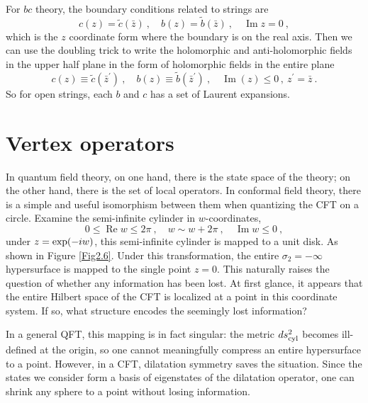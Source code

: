 For $bc$ theory, the boundary conditions related to strings are    
\begin{equation}
	c(z)=\tilde{c}(\bar{z})\: , \quad b(z)=\tilde{b}(\bar{z}) \:, \quad \operatorname{Im} z=0 \:,  \label{2.7.29}
\end{equation}
which is the $z$ coordinate form where the boundary is on the real axis.    
Then we can use the doubling trick to write the holomorphic and anti-holomorphic fields in the upper half plane in the form of holomorphic fields in the entire plane    
\begin{equation}
	c(z) \equiv \tilde{c}(\bar{z}^{\prime})\:, \quad b(z) \equiv \tilde{b}(\bar{z}^{\prime})\:, \quad \operatorname{Im}(z) \leq 0\,,\: z^{\prime}=\bar{ z} \:.  \label{2.7.30}
\end{equation}
So for open strings, each $b$ and $c$ has a set of Laurent expansions.    
\section{\texorpdfstring{Vertex operators}{2.8 Vertex operators}}

In quantum field theory, on one hand, there is the state space of the theory; on the other hand, there is the set of local operators. In conformal field theory, there is a simple and useful isomorphism between them when quantizing the CFT on a circle.
Examine the semi-infinite cylinder in $w$-coordinates,    
\begin{equation}
	0 \leq \operatorname{Re} w \leq 2 \pi \:, \quad w \sim w+2 \pi \:, \quad \operatorname{Im} w \leq 0 \:, \label{2.8.1}
\end{equation}
under $z=\exp (-i w)$, this semi-infinite cylinder is mapped to a unit disk.    
As shown in Figure \ref{Fig2.6}.  Under this transformation, the entire $\sigma_2=-\infty$ hypersurface is mapped to the single point $z=0$. This naturally raises the question of whether any information has been lost. At first glance, it appears that the entire Hilbert space of the CFT is localized at a point in this coordinate system. If so, what structure encodes the seemingly lost information?

In a general QFT, this mapping is in fact singular: the metric $ds^2_{\rm cyl}$ becomes ill-defined at the origin, so one cannot meaningfully compress an entire hypersurface to a point. However, in a CFT, dilatation symmetry saves the situation. Since the states we consider form a basis of eigenstates of the dilatation operator, one can shrink any sphere to a point without losing information.

